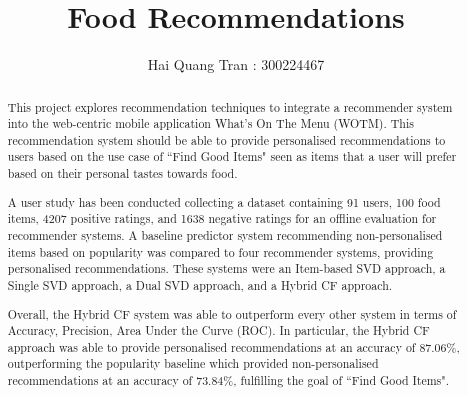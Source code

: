 \documentclass[11pt
, a4paper
, twoside
, openright
]{report}
\title{Food Recommendations}
\author{Hai Quang Tran : 300224467}
\date{}
\begin{document}
\frontmatter



\begin{abstract}

This project explores recommendation techniques to integrate a recommender system into the web-centric mobile application What's On The Menu (WOTM). This recommendation system should be able to provide personalised recommendations to users based on the use case of ``Find Good Items" seen as items that a user will prefer based on their personal tastes towards food.

A user study has been conducted collecting a dataset containing 91 users, 100 food items, 4207 positive ratings, and 1638 negative ratings for an offline evaluation for recommender systems. A baseline predictor system recommending non-personalised items based on popularity was compared to four recommender systems, providing personalised recommendations. These systems were an Item-based SVD approach, a Single SVD approach, a Dual SVD approach, and a Hybrid CF approach. 

Overall, the Hybrid CF system was able to outperform every other system in terms of Accuracy, Precision, Area Under the Curve (ROC). In particular, the Hybrid CF approach was able to provide personalised recommendations at an accuracy of 87.06\%, outperforming the popularity baseline which provided non-personalised recommendations at an accuracy of 73.84\%, fulfilling the goal of ``Find Good Items".  

\end{abstract}


\maketitle
\end{document}
